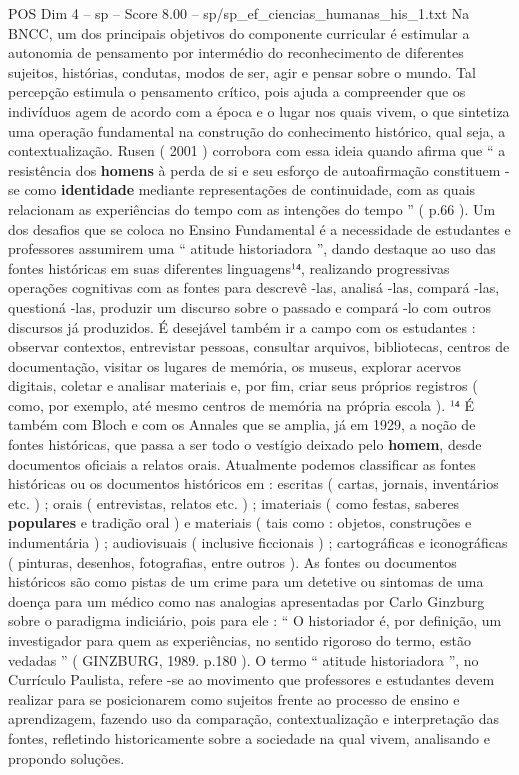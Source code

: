 \begin{textsample}{POS Dim 4 – sp – Score 8.00 – sp/sp\_ef\_ciencias\_humanas\_his\_1.txt}
Na BNCC, um dos principais objetivos do componente curricular é estimular a autonomia de pensamento por intermédio do reconhecimento de diferentes sujeitos, histórias, condutas, modos de ser, agir e pensar sobre o mundo.
Tal percepção estimula o pensamento crítico, pois ajuda a compreender que os indivíduos agem de acordo com a época e o lugar nos quais vivem, o que sintetiza uma operação fundamental na construção do conhecimento histórico, qual seja, a contextualização.
Rusen ( 2001 ) corrobora com essa ideia quando afirma que “ a resistência dos \textbf{homens} à perda de si e seu esforço de autoafirmação constituem -se como \textbf{identidade} mediante representações de continuidade, com as quais relacionam as experiências do tempo com as intenções do tempo ” ( p.66 ).
Um dos desafios que se coloca no Ensino Fundamental é a necessidade de estudantes e professores assumirem uma “ atitude historiadora ”, dando destaque ao uso das fontes históricas em suas diferentes linguagens¹⁴, realizando progressivas operações cognitivas com as fontes para descrevê -las, analisá -las, compará -las, questioná -las, produzir um discurso sobre o passado e compará -lo com outros discursos já produzidos.
É desejável também ir a campo com os estudantes : observar contextos, entrevistar pessoas, consultar arquivos, bibliotecas, centros de documentação, visitar os lugares de memória, os museus, explorar acervos digitais, coletar e analisar materiais e, por fim, criar seus próprios registros ( como, por exemplo, até mesmo centros de memória na própria escola ). ¹⁴ É também com Bloch e com os Annales que se amplia, já em 1929, a noção de fontes históricas, que passa a ser todo o vestígio deixado pelo \textbf{homem}, desde documentos oficiais a relatos orais.
Atualmente podemos classificar as fontes históricas ou os documentos históricos em : escritas ( cartas, jornais, inventários etc. ) ; orais ( entrevistas, relatos etc. ) ; imateriais ( como festas, saberes \textbf{populares} e tradição oral ) e materiais ( tais como : objetos, construções e indumentária ) ; audiovisuais ( inclusive ficcionais ) ; cartográficas e iconográficas ( pinturas, desenhos, fotografias, entre outros ).
As fontes ou documentos históricos são como pistas de um crime para um detetive ou sintomas de uma doença para um médico como nas analogias apresentadas por Carlo Ginzburg sobre o paradigma indiciário, pois para ele : “ O historiador é, por definição, um investigador para quem as experiências, no sentido rigoroso do termo, estão vedadas ” ( GINZBURG, 1989. p.180 ).
O termo “ atitude historiadora ”, no Currículo Paulista, refere -se ao movimento que professores e estudantes devem realizar para se posicionarem como sujeitos frente ao processo de ensino e aprendizagem, fazendo uso da comparação, contextualização e interpretação das fontes, refletindo historicamente sobre a sociedade na qual vivem, analisando e propondo soluções.

\end{textsample}
